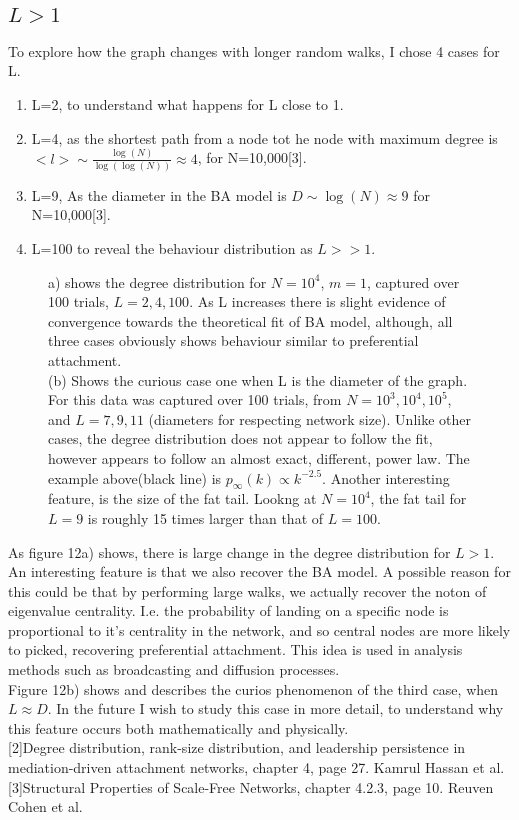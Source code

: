 \documentclass[]{article}
\begin{document}
\subsection{$L > 1$}
To explore how the graph changes with longer random walks, I chose 4 cases for L. 
\begin{enumerate}
	\item L=2, to understand what happens for L close to 1.
	\item L=4, as the shortest path from a node tot he node with maximum degree is $<l> \sim \frac{\log(N)}{\log(\log(N))} \approx 4$, for N=10,000[3]. 
	\item L=9, As the diameter in the BA model is $D \sim \log(N) \approx 9 $ for N=10,000[3].
	\item L=100 to reveal the behaviour distribution as $L >>1$.
\end{enumerate}
\begin{figure}[H]
			\caption{a) shows the degree distribution for $N=10^4$, $m=1$, captured over 100 trials, $L=2,4,100$. As L increases there is slight evidence of convergence towards the theoretical fit of BA model, although, all three cases obviously shows behaviour similar to preferential attachment.\\
			(b) Shows the curious case one when L is the diameter of the graph. For this data was captured over 100 trials, from $N=10^3,10^4,10^5$, and $L=7,9,11$ (diameters for respecting network size). Unlike other cases, the degree distribution does not appear to follow the fit, however appears to follow an almost exact, different, power law. The example above(black line) is $p_{\infty}(k) \propto k^{-2.5}$. Another interesting feature, is the size of the fat tail. Lookng at $N=10^4$, the fat tail for $L=9$ is roughly 15 times larger than that of $L=100$.  }	
\end{figure}
As figure 12a) shows, there is large change in the degree distribution for $L>1$. An interesting feature is that we also recover the BA model. A possible reason for this could be that by performing large walks, we actually recover the noton of eigenvalue centrality. I.e. the probability of landing on a specific node is proportional to it's centrality in the network, and so central nodes are more likely to picked, recovering preferential attachment. This idea is used in analysis methods such as broadcasting and diffusion processes. \\
Figure 12b) shows and describes the curios phenomenon of the third case, when $L \approx D$. In the future I wish to study this case in more detail, to understand why this feature occurs both mathematically and physically.\\


[2]Degree distribution, rank-size distribution, and leadership persistence in mediation-driven attachment networks, chapter 4, page 27. Kamrul Hassan et al.
[3]Structural Properties of Scale-Free Networks, chapter 4.2.3, page 10. Reuven Cohen et al.
\end{document}

